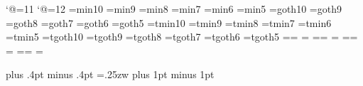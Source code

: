 %
%

\catcode`@=11 %
\def\footnote#1{\let\@sf\empty %
  \ifhmode\edef\@sf{\spacefactor\the\spacefactor}\/\fi
  \nobreak#1\@sf\vfootnote{#1}}
\catcode`@=12 %
%
\font\tenmin=min10 %
\font\preloaded=min9
\font\preloaded=min8
\font\sevenmin=min7
\font\preloaded=min6
\font\fivemin=min5
%
\font\tengt=goth10 %
\font\preloaded=goth9
\font\preloaded=goth8
\font\sevengt=goth7
\font\preloaded=goth6
\font\fivegt=goth5
%
\font\tentmin=tmin10 %
\font\preloaded=tmin9
\font\preloaded=tmin8
\font\seventmin=tmin7
\font\preloaded=tmin6
\font\fivetmin=tmin5
%
\font\tentgt=tgoth10 %
\font\preloaded=tgoth9
\font\preloaded=tgoth8
\font\seventgt=tgoth7
\font\preloaded=tgoth6
\font\fivetgt=tgoth5
%
\newfam\minfam %
\newfam\gtfam  %
\newfam\tminfam %
\newfam\tgtfam  %
%
\def\mc{\iftdir\fam\tminfam\tentmin\else\fam\minfam\tenmin\fi}%
\textfont\minfam=\tenmin\scriptfont\minfam=\sevenmin%
\scriptscriptfont\minfam=\fivemin
\textfont\tminfam=\tentmin\scriptfont\tminfam=\seventmin%
\scriptscriptfont\tminfam=\fivetmin
%
\def\gt{\iftdir\fam\tgtfam\tentgt\else\fam\gtfam\tengt\fi}%
\textfont\gtfam=\tengt\scriptfont\gtfam=\sevengt%
\scriptscriptfont\gtfam=\fivegt
\textfont\tgtfam=\tentgt\scriptfont\tgtfam=\seventgt%
\scriptscriptfont\tgtfam=\fivetgt
%

\mc		  %
\kanjiskip=0pt plus .4pt minus .4pt
\xkanjiskip=.25zw plus 1pt minus 1pt
\autospacing\autoxspacing
{}
%
\def\fmtname{ptex}
\edef\fmtversion{\fmtversion\space p1.0b}
